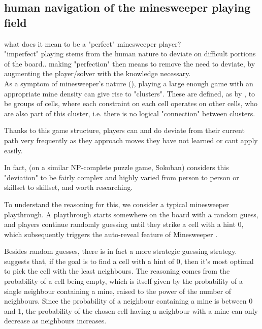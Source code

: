 \subsection{human navigation of the minesweeper playing field} \label{awa:pathfindingWRTgameLogicStructure}
what does it mean to be a "perfect" minesweeper player? \\
"imperfect" playing stems from the human nature to deviate on difficult portions of the board.. making "perfection" then means to remove the need to deviate, by augmenting the player/solver with the knowledge necessary.
 \\

As a symptom of minesweeper's nature (), playing a large enough game with an appropriate mine density can give rise to "clusters". These are defined, as by \citet{minesweeperGameGridGeneration}, to be groups of cells, where each constraint on each cell operates on other cells, who are also part of this cluster, i.e. there is no logical "connection" between clusters.

Thanks to this game structure, players can and do deviate from their current path very frequently as they approach moves they have not learned or cant apply easily.

In fact, \citet{whyArePuzzlesFun} (on a similar NP-complete puzzle game, Sokoban) considers this "deviation" to be fairly complex and highly varied from person to person or skillset to skillset, and worth researching. 

To understand the reasoning for this, we consider a typical minesweeper playthrough. A playthrough starts somewhere on the board with a random guess, and players continue randomly guessing until they strike a cell with a hint 0, which subsequently triggers the auto-reveal feature of Minesweeper \citet{minesweeperAutoreveal}.

Besides random guesses, there is in fact a more strategic guessing strategy. \citet{Studholme2001MinesweeperCSPencoding} suggests that, if the goal is to find a cell with a hint of 0, then it's most optimal to pick the cell with the least neighbours. The reasoning comes from the probability of a cell being empty, which is itself given by the probability of a single neighbour containing a mine, raised to the power of the number of neighbours. Since the probability of a neighbour containing a mine is between 0 and 1, the probability of the chosen cell having a neighbour with a mine can only decrease as neighbours increases.

